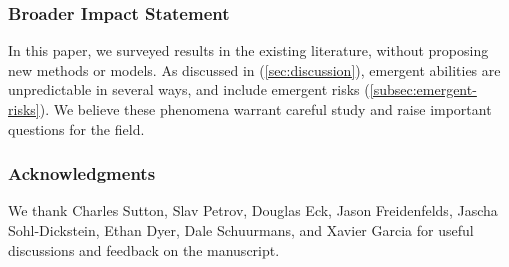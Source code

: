 \subsubsection*{Broader Impact Statement} In this paper, we surveyed results in the existing literature, without proposing new methods or models. As discussed in (\ref{sec:discussion}), emergent abilities are unpredictable in several ways, and include emergent risks (\ref{subsec:emergent-risks}).
We believe these phenomena warrant careful study and raise important questions for the field.

\subsubsection*{Acknowledgments}
We thank Charles Sutton, Slav Petrov, Douglas Eck, Jason Freidenfelds, Jascha Sohl-Dickstein, Ethan Dyer, Dale Schuurmans, and Xavier Garcia for useful discussions and feedback on the manuscript.



